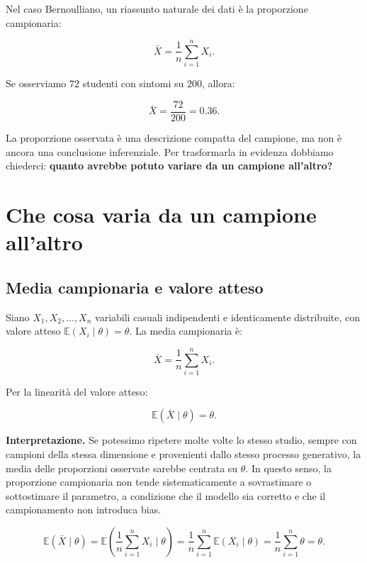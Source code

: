 \documentclass[
  italian,
  letterpaper,
  a4paper,
  11pt,
  open=any]{scrbook}
\theoremstyle{plain}
\theoremstyle{definition}
\theoremstyle{definition}
\theoremstyle{remark}
\begin{document}
Nel caso Bernoulliano, un riassunto naturale dei dati è la proporzione
campionaria:

\[
\bar{X} = \frac{1}{n}\sum_{i=1}^{n} X_i.
\]

Se osserviamo \(72\) studenti con sintomi su \(200\), allora:

\[
\bar{X} = \frac{72}{200} = 0.36.
\]

La proporzione osservata è una descrizione compatta del campione, ma non
è ancora una conclusione inferenziale. Per trasformarla in evidenza
dobbiamo chiederci: \textbf{quanto avrebbe potuto variare da un campione
all'altro?}

\section{Che cosa varia da un campione
all'altro}\label{sec-what-varies-across-samples}

\subsection{Media campionaria e valore
atteso}\label{media-campionaria-e-valore-atteso}

Siano \(X_1, X_2, \ldots, X_n\) variabili casuali indipendenti e
identicamente distribuite, con valore atteso
\(\mathbb{E}(X_i \mid \theta) = \theta\). La media campionaria è:

\[
\bar{X} = \frac{1}{n}\sum_{i=1}^{n} X_i.
\]

Per la linearità del valore atteso:

\[
\mathbb{E}(\bar{X} \mid \theta) = \theta.
\]

\textbf{Interpretazione.} Se potessimo ripetere molte volte lo stesso
studio, sempre con campioni della stessa dimensione e provenienti dallo
stesso processo generativo, la media delle proporzioni osservate sarebbe
centrata su \(\theta\). In questo senso, la proporzione campionaria non
tende sistematicamente a sovrastimare o sottostimare il parametro, a
condizione che il modello sia corretto e che il campionamento non
introduca bias.

\begin{tcolorbox}[enhanced jigsaw, arc=.35mm, bottomrule=.15mm, bottomtitle=1mm, breakable, colback=white, colbacktitle=quarto-callout-note-color!10!white, colframe=quarto-callout-note-color-frame, coltitle=black, left=2mm, leftrule=.75mm, opacityback=0, opacitybacktitle=0.6, rightrule=.15mm, title=\textcolor{quarto-callout-note-color}{\faInfo}\hspace{0.5em}{Dimostrazione}, titlerule=0mm, toprule=.15mm, toptitle=1mm]

\[
\mathbb{E}(\bar{X} \mid \theta)
= \mathbb{E}\left(\frac{1}{n}\sum_{i=1}^{n}X_i \mid \theta\right)
= \frac{1}{n}\sum_{i=1}^{n}\mathbb{E}(X_i \mid \theta)
= \frac{1}{n}\sum_{i=1}^{n}\theta
= \theta.
\]

\end{tcolorbox}
\end{document}
